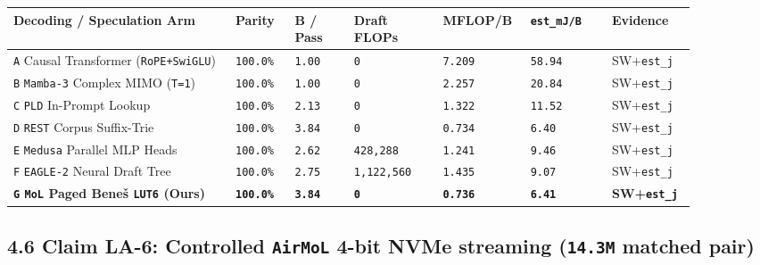 \documentclass[10pt]{article}
\begin{document}
{\footnotesize\setlength{\tabcolsep}{3.5pt}
\begin{longtable}{@{}L{0.30\linewidth}C{0.08\linewidth}C{0.08\linewidth}C{0.12\linewidth}C{0.10\linewidth}C{0.11\linewidth}L{0.10\linewidth}@{}}
\toprule
\textbf{Decoding / Speculation Arm} & \textbf{Parity} & \textbf{B / Pass} & \textbf{Draft FLOPs} & \textbf{MFLOP/B} & \textbf{\texttt{est\_mJ/B}} & \textbf{Evidence} \\
\midrule
\endhead
\texttt{A} Causal Transformer (\texttt{RoPE+SwiGLU}) & \texttt{100.0\%} & \texttt{1.00} & \texttt{0} & \texttt{7.209} & \texttt{58.94} & SW+\texttt{est\_j} \\
\texttt{B} \texttt{Mamba-3} Complex MIMO (\texttt{T=1}) & \texttt{100.0\%} & \texttt{1.00} & \texttt{0} & \texttt{2.257} & \texttt{20.84} & SW+\texttt{est\_j} \\
\texttt{C} \texttt{PLD} In-Prompt Lookup & \texttt{100.0\%} & \texttt{2.13} & \texttt{0} & \texttt{1.322} & \texttt{11.52} & SW+\texttt{est\_j} \\
\texttt{D} \texttt{REST} Corpus Suffix-Trie & \texttt{100.0\%} & \texttt{3.84} & \texttt{0} & \texttt{0.734} & \texttt{6.40} & SW+\texttt{est\_j} \\
\texttt{E} \texttt{Medusa} Parallel MLP Heads & \texttt{100.0\%} & \texttt{2.62} & \texttt{428,288} & \texttt{1.241} & \texttt{9.46} & SW+\texttt{est\_j} \\
\texttt{F} \texttt{EAGLE-2} Neural Draft Tree & \texttt{100.0\%} & \texttt{2.75} & \texttt{1,122,560} & \texttt{1.435} & \texttt{9.07} & SW+\texttt{est\_j} \\
\textbf{\texttt{G} \texttt{MoL} Paged Bene\v{s} \texttt{LUT6} (Ours)} & \textbf{\texttt{100.0\%}} & \textbf{\texttt{3.84}} & \textbf{\texttt{0}} & \textbf{\texttt{0.736}} & \textbf{\texttt{6.41}} & \textbf{SW+\texttt{est\_j}} \\
\bottomrule
\end{longtable}
}

\subsection{4.6 Claim LA-6: Controlled \texttt{AirMoL} 4-bit NVMe streaming (\texttt{14.3M} matched pair)}\label{claim-la6}
\end{document}
